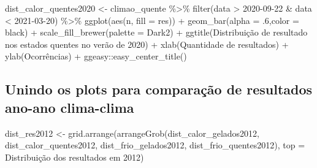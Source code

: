 \documentclass[
]{article}
\newenvironment{Shaded}{\begin{snugshade}}{\end{snugshade}}
\newcommand{\AttributeTok}[1]{\textcolor[rgb]{0.77,0.63,0.00}{#1}}
\newcommand{\DecValTok}[1]{\textcolor[rgb]{0.00,0.00,0.81}{#1}}
\newcommand{\FunctionTok}[1]{\textcolor[rgb]{0.00,0.00,0.00}{#1}}
\newcommand{\NormalTok}[1]{#1}
\newcommand{\OtherTok}[1]{\textcolor[rgb]{0.56,0.35,0.01}{#1}}
\newcommand{\SpecialCharTok}[1]{\textcolor[rgb]{0.00,0.00,0.00}{#1}}
\newcommand{\StringTok}[1]{\textcolor[rgb]{0.31,0.60,0.02}{#1}}
\begin{document}
\begin{Shaded}
\begin{Highlighting}[]
\NormalTok{dist\_calor\_quentes2020 }\OtherTok{\textless{}{-}}\NormalTok{ climao\_quente }\SpecialCharTok{\%\textgreater{}\%} 
  \FunctionTok{filter}\NormalTok{(data }\SpecialCharTok{\textgreater{}} \StringTok{\textquotesingle{}2020{-}09{-}22\textquotesingle{}} \SpecialCharTok{\&}\NormalTok{ data }\SpecialCharTok{\textless{}} \StringTok{\textquotesingle{}2021{-}03{-}20\textquotesingle{}}\NormalTok{) }\SpecialCharTok{\%\textgreater{}\%}
  \FunctionTok{ggplot}\NormalTok{(}\FunctionTok{aes}\NormalTok{(n, }\AttributeTok{fill =}\NormalTok{ res)) }\SpecialCharTok{+} 
  \FunctionTok{geom\_bar}\NormalTok{(}\AttributeTok{alpha =}\NormalTok{ .}\DecValTok{6}\NormalTok{,}\AttributeTok{color =} \StringTok{\textquotesingle{}black\textquotesingle{}}\NormalTok{) }\SpecialCharTok{+} 
  \FunctionTok{scale\_fill\_brewer}\NormalTok{(}\AttributeTok{palette =} \StringTok{\textquotesingle{}Dark2\textquotesingle{}}\NormalTok{) }\SpecialCharTok{+}
  \FunctionTok{ggtitle}\NormalTok{(}\StringTok{\textquotesingle{}Distribuição de resultado nos estados quentes no verão de 2020\textquotesingle{}}\NormalTok{) }\SpecialCharTok{+}
  \FunctionTok{xlab}\NormalTok{(}\StringTok{\textquotesingle{}Quantidade de resultados\textquotesingle{}}\NormalTok{) }\SpecialCharTok{+} \FunctionTok{ylab}\NormalTok{(}\StringTok{\textquotesingle{}Ocorrências\textquotesingle{}}\NormalTok{) }\SpecialCharTok{+}
\NormalTok{  ggeasy}\SpecialCharTok{::}\FunctionTok{easy\_center\_title}\NormalTok{() }
\end{Highlighting}
\end{Shaded}

\hypertarget{unindo-os-plots-para-comparauxe7uxe3o-de-resultados-ano-ano-clima-clima}{%
\subsection{Unindo os plots para comparação de resultados ano-ano
clima-clima}\label{unindo-os-plots-para-comparauxe7uxe3o-de-resultados-ano-ano-clima-clima}}

\begin{Shaded}
\begin{Highlighting}[]
\NormalTok{dist\_res2012 }\OtherTok{\textless{}{-}} \FunctionTok{grid.arrange}\NormalTok{(}\FunctionTok{arrangeGrob}\NormalTok{(dist\_calor\_gelados2012, dist\_calor\_quentes2012,}
\NormalTok{                         dist\_frio\_gelados2012, dist\_frio\_quentes2012), }
                         \AttributeTok{top =} \StringTok{\textquotesingle{}Distribuição dos resultados em 2012\textquotesingle{}}\NormalTok{)}
\end{Highlighting}
\end{Shaded}
\end{document}
